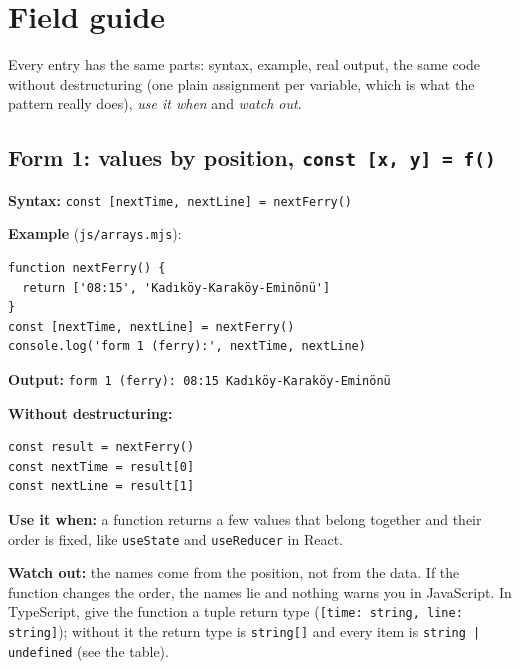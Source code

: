 \documentclass[
  10pt,
]{article}
\begin{document}
\hypertarget{field-guide}{%
\section{Field guide}\label{field-guide}}

Every entry has the same parts: syntax, example, real output, the same
code without destructuring (one plain assignment per variable, which is
what the pattern really does), \emph{use it when} and \emph{watch out}.

\hypertarget{form-1-values-by-position-const-x-y--f}{%
\subsection{\texorpdfstring{Form 1: values by position,
\texttt{const [\allowbreak{}x,\allowbreak{} y] =\allowbreak{} f(\allowbreak{})}}{Form 1: values by position, }}\label{form-1-values-by-position-const-x-y--f}}

\textbf{Syntax:}
\texttt{const [\allowbreak{}nextTime,\allowbreak{} nextLine] =\allowbreak{} nextFerry(\allowbreak{})}

\textbf{Example} (\texttt{js/\allowbreak{}arrays.\allowbreak{}mjs}):

\begin{verbatim}
function nextFerry() {
  return ['08:15', 'Kadıköy-Karaköy-Eminönü']
}
const [nextTime, nextLine] = nextFerry()
console.log('form 1 (ferry):', nextTime, nextLine)
\end{verbatim}

\textbf{Output:}
\texttt{form 1 (\allowbreak{}ferry):\allowbreak{} 08:\allowbreak{}15 Kadıköy-Karaköy-Eminönü}

\textbf{Without destructuring:}

\begin{verbatim}
const result = nextFerry()
const nextTime = result[0]
const nextLine = result[1]
\end{verbatim}

\textbf{Use it when:} a function returns a few values that belong
together and their order is fixed, like \texttt{useState} and
\texttt{useReducer} in React.

\textbf{Watch out:} the names come from the position, not from the data.
If the function changes the order, the names lie and nothing warns you
in JavaScript. In TypeScript, give the function a tuple return type
(\texttt{[\allowbreak{}time:\allowbreak{} string,\allowbreak{} line:\allowbreak{} string]});
without it the return type is \texttt{string[\allowbreak{}]} and every
item is \texttt{string |\allowbreak{} undefined} (see the table).
\end{document}
